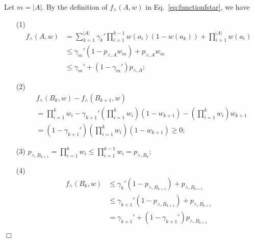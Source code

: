 \documentclass{article}
\newcommand{\abs}[1]{\left| #1 \right|}
\newenvironment{proof}{\noindent {\textbf{Proof. }}}{$\Box$ \medskip}
\begin{document}
\begin{proof}
Let $m = |A|$.
By the definition of $f_{\wedge}(A,w)$ in Eq.~\eqref{eq:functionfstar}, we have
\begin{itemize}
\item[(1)]
\begin{align*}
	f_{\wedge}(A,w) & = \sum_{k = 1}^{\abs{A}} \gamma_k' \prod_{i = 1}^{k - 1} w(a_i)
	(1 - w(a_k)) + \prod_{i=1}^{\abs{A}}w(a_i) \\
 &\leq \gamma_m'(1 - p_{\wedge, A} w_m) + p_{\wedge, A} w_m \\
&\leq \gamma_m' + (1 - \gamma_m') p_{\wedge, A};
\end{align*}

\item[(2)]
\begin{align*}
&f_{\wedge}(B_k, w) - f_{\wedge}(B_{k+1}, w)\\
&=\prod_{i=1}^{k}w_i - \gamma_{k+1}' (\prod_{i=1}^{k}w_i) (1 - w_{k+1}) - (\prod_{i=1}^{k}w_i) w_{k+1}\\
&=(1 - \gamma_{k+1}') (\prod_{i=1}^{k}w_i) (1 - w_{k+1}) \geq 0;
\end{align*}

\item[(3)]
$p_{\wedge, B_{k+1}} = \prod_{i=1}^{k} w_i \leq \prod_{i=1}^{k-1} w_i = p_{\wedge, B_k}$;

\item[(4)]
\begin{align*}
f_{\wedge}(B_k, w) & \leq \gamma_{k}' (1 - p_{\wedge,B_{k+1}}) + p_{\wedge,B_{k+1}}\\
&\leq \gamma_{k+1}' (1 - p_{\wedge,B_{k+1}}) + p_{\wedge,B_{k+1}} \\
&= \gamma_{k+1}' + (1 - \gamma_{k+1}') p_{\wedge,B_{k+1}}
\end{align*}
\end{itemize}
\end{proof}
\end{document}
